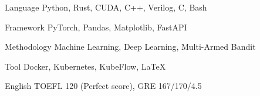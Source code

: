 

\begin{cvskills}

  \cvskill
    {Language} %
    {Python, Rust, CUDA, C++, Verilog, C, Bash} %

  \cvskill
    {Framework} %
    {PyTorch, Pandas, Matplotlib, FastAPI} %

  \cvskill
    {Methodology} %
    {Machine Learning, Deep Learning, Multi-Armed Bandit} %

  \cvskill
    {Tool} %
    {Docker, Kubernetes, KubeFlow, LaTeX} %

  \cvskill
    {English} %
    {TOEFL 120 (Perfect score), GRE 167/170/4.5} %

\end{cvskills}
